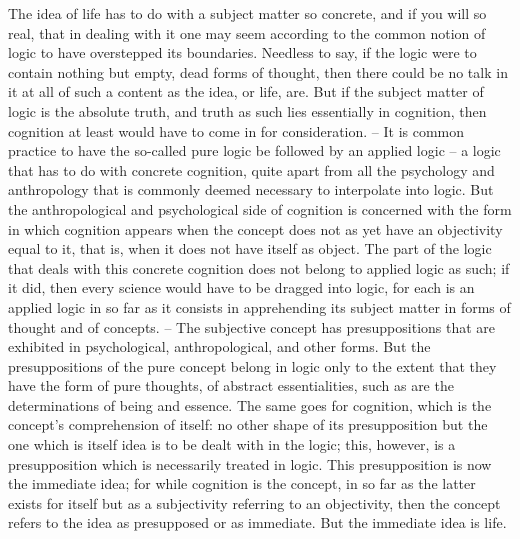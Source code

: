 The idea of life has to do with a subject matter so concrete, and if you will so
real, that in dealing with it one may seem according to the common notion
of logic to have overstepped its boundaries. Needless to say, if the logic were
to contain nothing but empty, dead forms of thought, then there could be
no talk in it at all of such a content as the idea, or life, are. But if the subject
matter of logic is the absolute truth, and truth as such lies essentially in
cognition, then cognition at least would have to come in for consideration. –
It is common practice to have the so-called pure logic be followed by an
applied logic – a logic that has to do with concrete cognition, quite apart from
all the psychology and anthropology that is commonly deemed necessary to
interpolate into logic. But the anthropological and psychological side of
cognition is concerned with the form in which cognition appears when the
concept does not as yet have an objectivity equal to it, that is, when it
does not have itself as object. The part of the logic that deals with this
concrete cognition does not belong to applied logic as such; if it did, then
every science would have to be dragged into logic, for each is an applied
logic in so far as it consists in apprehending its subject matter in forms of
thought and of concepts. – The subjective concept has presuppositions that
are exhibited in psychological, anthropological, and other forms. But the
presuppositions of the pure concept belong in logic only to the extent that
they have the form of pure thoughts, of abstract essentialities, such as are the
determinations of being and essence. The same goes for cognition, which is
the concept’s comprehension of itself: no other shape of its presupposition
but the one which is itself idea is to be dealt with in the logic; this, however,
is a presupposition which is necessarily treated in logic. This presupposition
is now the immediate idea; for while cognition is the concept, in so far as
the latter exists for itself but as a subjectivity referring to an objectivity,
then the concept refers to the idea as presupposed or as immediate. But the
immediate idea is life.

